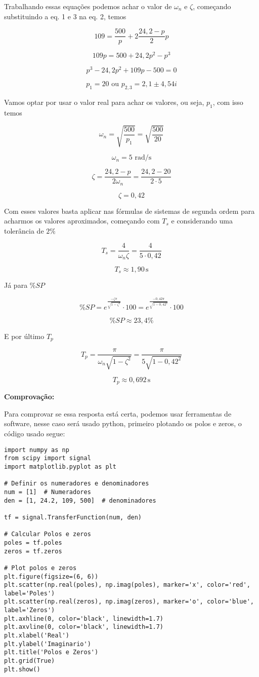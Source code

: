 Trabalhando essas equações podemos achar o valor de \( \omega_n\) e \( \zeta \), começando substituindo a eq. 1 e 3 na eq. 2, temos

\[ 109 = \dfrac{500}{p} + 2 \dfrac{24,2-p}{2}p \]

\[109p = 500 + 24,2p^2-p^3 \]

\[ p^3 - 24,2p^2+109p -500 = 0 \]

\[ \boxed{p_1 = 20 \,\,\mathrm{ou}\,\, p_{2,3}=2,1\pm 4,54i} \]

\newpage

Vamos optar por usar o valor real para achar os valores, ou seja, \(p_1\), com isso temos

\[ \omega_n = \sqrt{\dfrac{500}{p_1}} = \sqrt{\dfrac{500}{20}} \]

\[\boxed{ \omega_n = 5 \,\, \mathrm{rad/s}} \]

\[ \zeta = \dfrac{24,2-p}{2\omega_n} = \dfrac{24,2 - 20}{2\cdot 5} \]

\[ \boxed{\zeta = 0,42} \]

Com esses valores basta aplicar nas fórmulas de sistemas de segunda ordem para acharmos os valores aproximados, começando com \( T_s\) e considerando uma tolerância de \( 2\%\) 

\[ T_s = \dfrac{4}{\omega_n \zeta} = \dfrac{4}{5\cdot 0,42}  \]

\[ \boxed{T_s \approx 1,90 \,\mathrm{s}} \]

Já para \( \% SP \)

\[ \% SP = e^{\frac{-\zeta \pi}{\sqrt{1-\zeta^2}}}\cdot 100 = e^{\frac{-0,42 \pi}{\sqrt{1-0,42^2}}}\cdot 100\]

\[ \boxed{\% SP \approx 23,4\%} \]

E por último \( T_p \)

\[ T_p = \dfrac{\pi}{\omega_n \sqrt{1 - \zeta^2}} = \dfrac{\pi}{5\sqrt{1-0,42^2}} \] 

\[ \boxed{T_p \approx 0,692 \, \mathrm{s}} \]

%
%
\noindent \textbf{Comprovação: }


Para comprovar se essa resposta está certa, podemos usar ferramentas de software, nesse caso será usado python, primeiro plotando os polos e zeros, o código usado segue:

\begin{lstlisting}
import numpy as np
from scipy import signal
import matplotlib.pyplot as plt

# Definir os numeradores e denominadores
num = [1]  # Numeradores
den = [1, 24.2, 109, 500]  # denominadores

tf = signal.TransferFunction(num, den)

# Calcular Polos e zeros
poles = tf.poles
zeros = tf.zeros

# Plot polos e zeros
plt.figure(figsize=(6, 6))
plt.scatter(np.real(poles), np.imag(poles), marker='x', color='red', label='Poles')
plt.scatter(np.real(zeros), np.imag(zeros), marker='o', color='blue', label='Zeros')
plt.axhline(0, color='black', linewidth=1.7)
plt.axvline(0, color='black', linewidth=1.7)
plt.xlabel('Real')
plt.ylabel('Imaginario')
plt.title('Polos e Zeros')
plt.grid(True)
plt.show()
\end{lstlisting}

